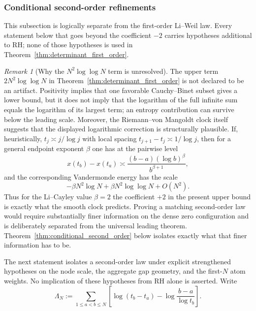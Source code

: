 \documentclass[preprint,12pt]{elsarticle}
\numberwithin{equation}{section}
\theoremstyle{plain}
\theoremstyle{definition}
\theoremstyle{remark}
\newtheorem{remark}[theorem]{Remark}
\newcommand{\RH}{\mathrm{RH}}
\begin{document}
\subsubsection{Conditional second-order refinements}
\label{subsubsec:conditional_second_order}
This subsection is logically separate from the first-order Li--Weil law.  Every statement below
that goes beyond the coefficient \(-2\) carries hypotheses additional to \(\RH\); none of those
hypotheses is used in Theorem~\ref{thm:determinant_first_order}.

\begin{remark}[Why the $N^2\log\log N$ term is unresolved]
\label{rem:second_order_not_artifact}
The upper term $2N^2\log\log N$ in Theorem~\ref{thm:determinant_first_order} is not declared to be an artifact. Positivity implies that one favorable Cauchy--Binet subset gives a lower bound, but it does not imply that the logarithm of the full infinite sum equals the logarithm of its largest term; an entropy contribution can survive below the leading scale. Moreover, the Riemann--von Mangoldt clock itself suggests that the displayed logarithmic correction is structurally plausible. If, heuristically, $t_j\asymp j/\log j$ with local spacing $t_{j+1}-t_j\asymp1/\log j$, then for a general endpoint exponent $\beta$ one has at the pairwise level
\begin{equation}
x(t_b)-x(t_a)
\asymp
\frac{(b-a)(\log b)^{\beta}}{b^{\beta+1}},
\label{eq:clock_gap_second_order}
\end{equation}
and the corresponding Vandermonde energy has the scale
\begin{equation}
-\beta N^2\log N
+\beta N^2\log\log N
+O(N^2).
\label{eq:clock_vandermonde_second_order}
\end{equation}
Thus for the Li--Cayley value $\beta=2$ the coefficient $+2$ in the present upper bound is exactly what the smooth clock predicts. Proving a matching second-order law would require substantially finer information on the dense zero configuration and is deliberately separated from the universal leading theorem. Theorem~\ref{thm:conditional_second_order} below isolates exactly what that finer information has to be.
\end{remark}

The next statement isolates a second-order law under explicit strengthened hypotheses on the node scale, the aggregate gap geometry, and the first-$N$ atom weights.  No implication of these hypotheses from $\RH$ alone is asserted. Write
\begin{equation}
\Lambda_N:=
\sum_{1\le a<b\le N}
\left[
\log(t_b-t_a)-\log\frac{b-a}{\log t_b}
\right].
\label{eq:gap_regularity_functional}
\end{equation}
\end{document}
